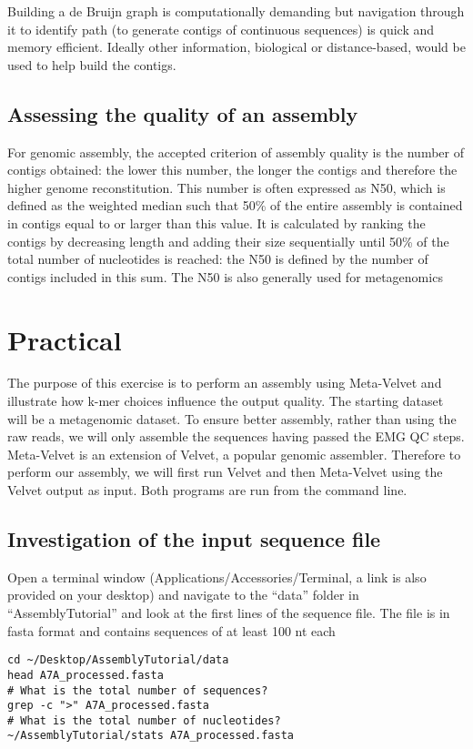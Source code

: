 Building a de Bruijn graph is computationally demanding but navigation through it to identify path (to generate contigs of continuous sequences) is quick and memory efficient. Ideally other information, biological or distance-based, would be used to help build the contigs.

\subsection{Assessing the quality of an assembly}

For genomic assembly, the accepted criterion of assembly quality is the number of contigs obtained: the lower this number, the longer the contigs and therefore the higher genome reconstitution.
This number is often expressed as N50, which is defined as the weighted median such that 50\% of the entire assembly is contained in contigs equal to or larger than this value. It is calculated by ranking the contigs by decreasing length and adding their size sequentially until 50\% of the total number of nucleotides is reached: the N50 is defined by the number of contigs included in this sum.
The N50 is also generally used for metagenomics

\section{Practical}
The purpose of this exercise is to perform an assembly using Meta-Velvet and illustrate how k-mer choices influence the output quality.
The starting dataset will be a metagenomic dataset. To ensure better assembly, rather than using the raw reads, we will only assemble the sequences having passed the EMG QC steps.
Meta-Velvet is an extension of Velvet, a popular genomic assembler. Therefore to perform our assembly, we will first run Velvet and then Meta-Velvet using the Velvet output as input. Both programs are run from the command line. 

\subsection{Investigation of the input sequence file}

\begin{steps}
Open a terminal window (Applications/Accessories/Terminal, a link is also provided on your desktop) and navigate to the “data” folder in “AssemblyTutorial” and look at the first lines of the sequence file. The file is in fasta format and contains sequences of at least 100 nt each
\begin{lstlisting}
cd ~/Desktop/AssemblyTutorial/data
head A7A_processed.fasta
# What is the total number of sequences?
grep -c ">" A7A_processed.fasta
# What is the total number of nucleotides?
~/AssemblyTutorial/stats A7A_processed.fasta
\end{lstlisting}
\end{steps}

